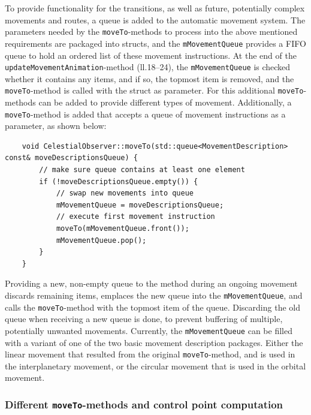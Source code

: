 To provide functionality for the transitions, as well as future, potentially complex movements and routes, a queue is
added to the automatic movement system.
The parameters needed by the \texttt{moveTo}-methods to process into the above mentioned requirements are
packaged into structs, and the \texttt{mMovementQueue} provides a FIFO queue to hold an ordered list of these
movement instructions.
At the end of the \texttt{updateMovementAnimation}-method (ll.\@18--24), the
\texttt{mMovementQueue} is checked whether it contains any items, and if so, the topmost item is removed, and the
\texttt{moveTo}-method is called with the struct as parameter.
For this additional \texttt{moveTo}-methods can be added to provide different types of movement.
Additionally, a \texttt{moveTo}-method is added that accepts a queue of movement instructions as a parameter, as
shown below:
\begin{verbatim}
    void CelestialObserver::moveTo(std::queue<MovementDescription> const& moveDescriptionsQueue) {
        // make sure queue contains at least one element
        if (!moveDescriptionsQueue.empty()) {
            // swap new movements into queue
            mMovementQueue = moveDescriptionsQueue;
            // execute first movement instruction
            moveTo(mMovementQueue.front());
            mMovementQueue.pop();
        }
    }
\end{verbatim}
Providing a new, non-empty queue to the method during an ongoing movement discards remaining items, emplaces the
new queue into the \texttt{mMovementQueue}, and calls the \texttt{moveTo}-method with the topmost item
of the queue.
Discarding the old queue when receiving a new queue is done, to prevent buffering of multiple, potentially unwanted
movements.
Currently, the \texttt{mMovementQueue} can be filled with a variant of one of the two basic movement description
packages.
Either the linear movement that resulted from the original \texttt{moveTo}-method, and is used in the
interplanetary movement, or the circular movement that is used in the orbital movement.

\subsubsection{Different \texttt{moveTo}-methods and control point computation}\label{subsubsec:different-moveto-methods-and-control-point-computation}

